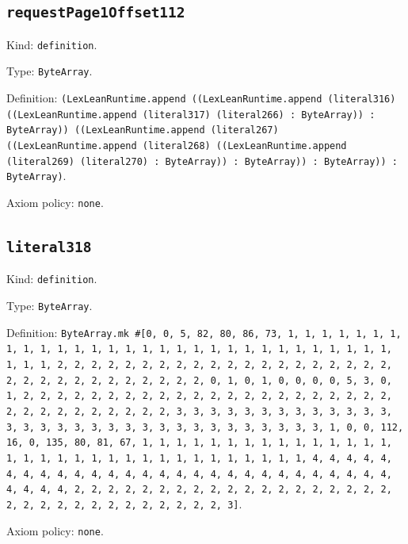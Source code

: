 \documentclass[11pt]{article}
\begin{document}
\subsection*{\texttt{requestPage1Offset112}}
\noindent Kind: \texttt{definition}.\par
\noindent Type: \texttt{ByteArray}.\par
\noindent Definition: \texttt{(LexLeanRuntime.append ((LexLeanRuntime.append (literal316) ((LexLeanRuntime.append (literal317) (literal266) : ByteArray)) : ByteArray)) ((LexLeanRuntime.append (literal267) ((LexLeanRuntime.append (literal268) ((LexLeanRuntime.append (literal269) (literal270) : ByteArray)) : ByteArray)) : ByteArray)) : ByteArray)}.\par
\noindent Axiom policy: \texttt{none}.\par
\subsection*{\texttt{literal318}}
\noindent Kind: \texttt{definition}.\par
\noindent Type: \texttt{ByteArray}.\par
\noindent Definition: \texttt{ByteArray.mk \#[0, 0, 5, 82, 80, 86, 73, 1, 1, 1, 1, 1, 1, 1, 1, 1, 1, 1, 1, 1, 1, 1, 1, 1, 1, 1, 1, 1, 1, 1, 1, 1, 1, 1, 1, 1, 1, 1, 1, 1, 2, 2, 2, 2, 2, 2, 2, 2, 2, 2, 2, 2, 2, 2, 2, 2, 2, 2, 2, 2, 2, 2, 2, 2, 2, 2, 2, 2, 2, 2, 2, 2, 0, 1, 0, 1, 0, 0, 0, 0, 5, 3, 0, 1, 2, 2, 2, 2, 2, 2, 2, 2, 2, 2, 2, 2, 2, 2, 2, 2, 2, 2, 2, 2, 2, 2, 2, 2, 2, 2, 2, 2, 2, 2, 2, 2, 3, 3, 3, 3, 3, 3, 3, 3, 3, 3, 3, 3, 3, 3, 3, 3, 3, 3, 3, 3, 3, 3, 3, 3, 3, 3, 3, 3, 3, 3, 3, 3, 1, 0, 0, 112, 16, 0, 135, 80, 81, 67, 1, 1, 1, 1, 1, 1, 1, 1, 1, 1, 1, 1, 1, 1, 1, 1, 1, 1, 1, 1, 1, 1, 1, 1, 1, 1, 1, 1, 1, 1, 1, 1, 1, 4, 4, 4, 4, 4, 4, 4, 4, 4, 4, 4, 4, 4, 4, 4, 4, 4, 4, 4, 4, 4, 4, 4, 4, 4, 4, 4, 4, 4, 4, 4, 4, 2, 2, 2, 2, 2, 2, 2, 2, 2, 2, 2, 2, 2, 2, 2, 2, 2, 2, 2, 2, 2, 2, 2, 2, 2, 2, 2, 2, 2, 2, 2, 2, 3]}.\par
\noindent Axiom policy: \texttt{none}.\par
\end{document}
